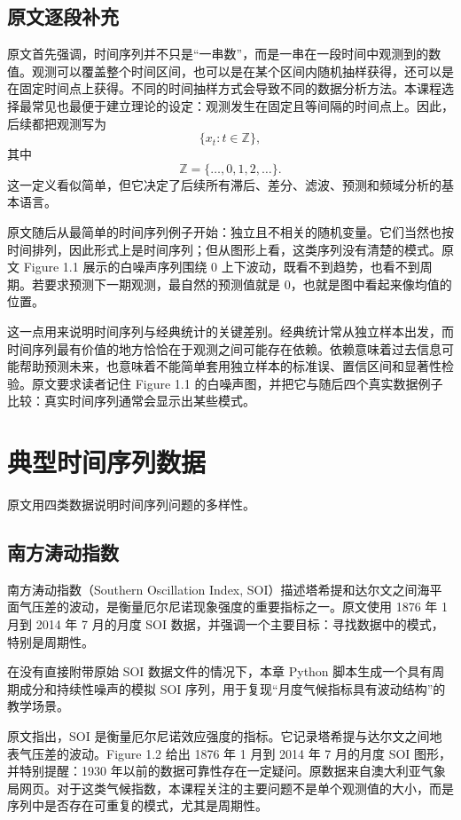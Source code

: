 \documentclass[11pt,a4paper]{ctexart}
\begin{document}
\subsection{原文逐段补充}

原文首先强调，时间序列并不只是“一串数”，而是一串在一段时间中观测到的数值。观测可以覆盖整个时间区间，也可以是在某个区间内随机抽样获得，还可以是在固定时间点上获得。不同的时间抽样方式会导致不同的数据分析方法。本课程选择最常见也最便于建立理论的设定：观测发生在固定且等间隔的时间点上。因此，后续都把观测写为
\[
  \{x_t:t\in\mathbb Z\},
\]
其中
\[
  \mathbb Z=\{\ldots,0,1,2,\ldots\}.
\]
这一定义看似简单，但它决定了后续所有滞后、差分、滤波、预测和频域分析的基本语言。

原文随后从最简单的时间序列例子开始：独立且不相关的随机变量。它们当然也按时间排列，因此形式上是时间序列；但从图形上看，这类序列没有清楚的模式。原文 Figure 1.1 展示的白噪声序列围绕 0 上下波动，既看不到趋势，也看不到周期。若要求预测下一期观测，最自然的预测值就是 0，也就是图中看起来像均值的位置。

这一点用来说明时间序列与经典统计的关键差别。经典统计常从独立样本出发，而时间序列最有价值的地方恰恰在于观测之间可能存在依赖。依赖意味着过去信息可能帮助预测未来，也意味着不能简单套用独立样本的标准误、置信区间和显著性检验。原文要求读者记住 Figure 1.1 的白噪声图，并把它与随后四个真实数据例子比较：真实时间序列通常会显示出某些模式。

\section{典型时间序列数据}

原文用四类数据说明时间序列问题的多样性。

\subsection{南方涛动指数}

南方涛动指数（Southern Oscillation Index, SOI）描述塔希提和达尔文之间海平面气压差的波动，是衡量厄尔尼诺现象强度的重要指标之一。原文使用 1876 年 1 月到 2014 年 7 月的月度 SOI 数据，并强调一个主要目标：寻找数据中的模式，特别是周期性。

在没有直接附带原始 SOI 数据文件的情况下，本章 Python 脚本生成一个具有周期成分和持续性噪声的模拟 SOI 序列，用于复现“月度气候指标具有波动结构”的教学场景。

原文指出，SOI 是衡量厄尔尼诺效应强度的指标。它记录塔希提与达尔文之间地表气压差的波动。Figure 1.2 给出 1876 年 1 月到 2014 年 7 月的月度 SOI 图形，并特别提醒：1930 年以前的数据可靠性存在一定疑问。原数据来自澳大利亚气象局网页。对于这类气候指数，本课程关注的主要问题不是单个观测值的大小，而是序列中是否存在可重复的模式，尤其是周期性。
\end{document}
